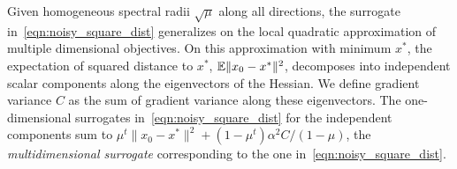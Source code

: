 Given homogeneous spectral radii $\sqrt{\mu}$ along all directions, the surrogate in~\eqref{eqn:noisy_square_dist} generalizes on the local quadratic approximation of multiple dimensional objectives. On this approximation with minimum $x^*$, the expectation of squared distance to $x^*$, $\mathbb{E} \| x_0 - x^*\|^2$, decomposes into independent scalar components along the eigenvectors of the Hessian. We define gradient variance $C$ as the sum of gradient variance along these eigenvectors. The one-dimensional surrogates in~\eqref{eqn:noisy_square_dist} for the independent components sum to $\mu^t\| x_0 - x^* \|^2 + (1-\mu^t)\alpha^2 C / (1 - \mu)$, the \emph{multidimensional surrogate} corresponding to the one in~\eqref{eqn:noisy_square_dist}. 

